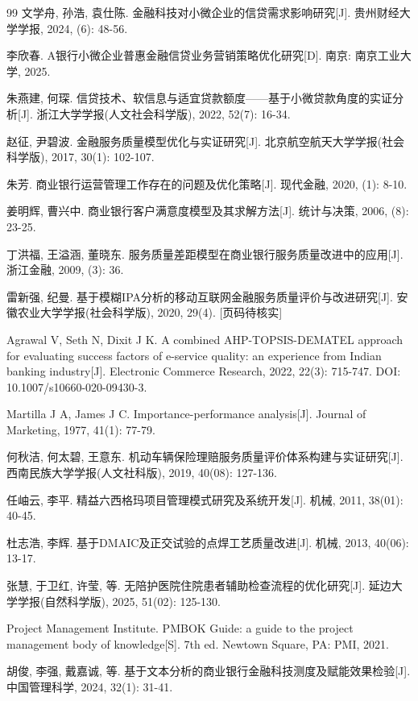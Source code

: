 \begin{thebibliography}{99}
 文学舟, 孙浩, 袁仕陈. 金融科技对小微企业的信贷需求影响研究[J]. 贵州财经大学学报, 2024, (6): 48-56.

 李欣春. A银行小微企业普惠金融信贷业务营销策略优化研究[D]. 南京: 南京工业大学, 2025.

 朱燕建, 何琛. 信贷技术、软信息与适宜贷款额度——基于小微贷款角度的实证分析[J]. 浙江大学学报(人文社会科学版), 2022, 52(7): 16-34.

 赵征, 尹碧波. 金融服务质量模型优化与实证研究[J]. 北京航空航天大学学报(社会科学版), 2017, 30(1): 102-107.

 朱芳. 商业银行运营管理工作存在的问题及优化策略[J]. 现代金融, 2020, (1): 8-10.

 姜明辉, 曹兴中. 商业银行客户满意度模型及其求解方法[J]. 统计与决策, 2006, (8): 23-25.

 丁洪福, 王溢涵, 董晓东. 服务质量差距模型在商业银行服务质量改进中的应用[J]. 浙江金融, 2009, (3): 36.

 雷新强, 纪曼. 基于模糊IPA分析的移动互联网金融服务质量评价与改进研究[J]. 安徽农业大学学报(社会科学版), 2020, 29(4). [页码待核实]

 Agrawal V, Seth N, Dixit J K. A combined AHP-TOPSIS-DEMATEL approach for evaluating success factors of e-service quality: an experience from Indian banking industry[J]. Electronic Commerce Research, 2022, 22(3): 715-747. DOI: 10.1007/s10660-020-09430-3.

 Martilla J A, James J C. Importance-performance analysis[J]. Journal of Marketing, 1977, 41(1): 77-79.

 何秋洁, 何太碧, 王意东. 机动车辆保险理赔服务质量评价体系构建与实证研究[J]. 西南民族大学学报(人文社科版), 2019, 40(08): 127-136.

 任岫云, 李平. 精益六西格玛项目管理模式研究及系统开发[J]. 机械, 2011, 38(01): 40-45.

 杜志浩, 李辉. 基于DMAIC及正交试验的点焊工艺质量改进[J]. 机械, 2013, 40(06): 13-17.

 张慧, 于卫红, 许莹, 等. 无陪护医院住院患者辅助检查流程的优化研究[J]. 延边大学学报(自然科学版), 2025, 51(02): 125-130.

 Project Management Institute. PMBOK Guide: a guide to the project management body of knowledge[S]. 7th ed. Newtown Square, PA: PMI, 2021.

 胡俊, 李强, 戴嘉诚, 等. 基于文本分析的商业银行金融科技测度及赋能效果检验[J]. 中国管理科学, 2024, 32(1): 31-41.


\end{thebibliography}
